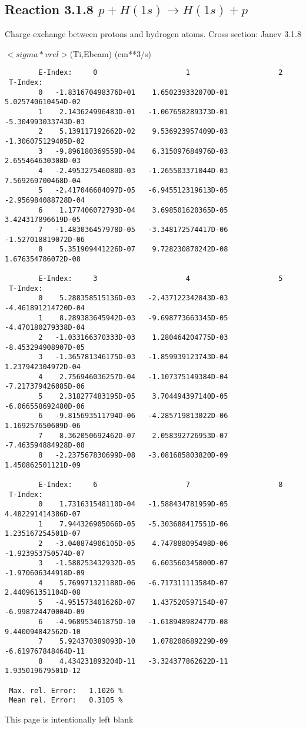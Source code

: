 \subsection{
Reaction 3.1.8  $ p + H(1s) \rightarrow H(1s) + p   $
}

 Charge exchange between protons and hydrogen
 atoms. Cross section: Janev  3.1.8

$ <sigma*vrel>$(Ti,Ebeam)  (cm**3/s)

\begin{verbatim}
        E-Index:     0                     1                     2
 T-Index:
        0   -1.831670498376D+01    1.650239332070D-01    5.025740610454D-02
        1    2.143624996483D-01   -1.067658289373D-01   -5.304993033743D-03
        2    5.139117192662D-02    9.536923957409D-03   -1.306075129405D-02
        3   -9.896180369559D-04    6.315097684976D-03    2.655464630308D-03
        4   -2.495327546080D-03   -1.265503371044D-03    7.569269700468D-04
        5   -2.417046684097D-05   -6.945512319613D-05   -2.956984088728D-04
        6    1.177406072793D-04    3.698501620365D-05    3.424317896619D-05
        7   -1.483036457978D-05   -3.348172574417D-06   -1.527018819072D-06
        8    5.351909441226D-07    9.728230870242D-08    1.676354786072D-08

        E-Index:     3                     4                     5
 T-Index:
        0    5.288358515136D-03   -2.437122342843D-03   -4.461891214720D-04
        1    8.289383645942D-03   -9.698773663345D-05   -4.470180279338D-04
        2   -1.033166370333D-03    1.280464204775D-03   -8.453294908907D-05
        3   -1.365781346175D-03   -1.859939123743D-04    1.237942304972D-04
        4    2.756946036257D-04   -1.107375149384D-04   -7.217379426085D-06
        5    2.318277483195D-05    3.704494397140D-05   -6.066558692480D-06
        6   -9.815693511794D-06   -4.285719813022D-06    1.169257650609D-06
        7    8.362050692462D-07    2.058392726953D-07   -7.463594884928D-08
        8   -2.237567830699D-08   -3.081685803820D-09    1.450862501121D-09

        E-Index:     6                     7                     8
 T-Index:
        0    1.731631548110D-04   -1.588434781959D-05    4.482291414386D-07
        1    7.944326905066D-05   -5.303688417551D-06    1.235167254501D-07
        2   -3.040874906105D-05    4.747888095498D-06   -1.923953750574D-07
        3   -1.588253432932D-05    6.603560345800D-07   -1.970606344918D-09
        4    5.769971321188D-06   -6.717311113584D-07    2.440961351104D-08
        5   -4.951573401626D-07    1.437520597154D-07   -6.998724470004D-09
        6   -4.968953461875D-10   -1.618948982477D-08    9.440094842562D-10
        7    5.924370389093D-10    1.078208689229D-09   -6.619767848464D-11
        8    4.434231893204D-11   -3.324377862622D-11    1.935019679501D-12

 Max. rel. Error:   1.1026 %
 Mean rel. Error:   0.3105 %

\end{verbatim}
\newpage
This page is intentionally left blank
\newpage

